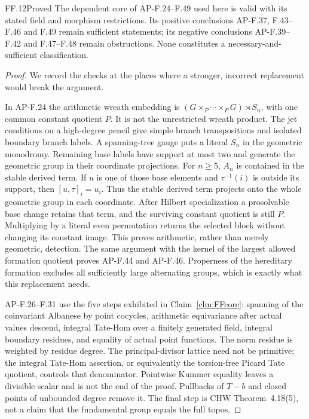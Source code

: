\begin{claim}{FF.12}{Proved}\label{clm:FFaudit}
The dependent core of AP-F.24--F.49 used here is valid with its
stated field and morphism restrictions. Its positive conclusions
AP-F.37, F.43--F.46 and F.49 remain sufficient statements; its
negative conclusions AP-F.39--F.42 and F.47--F.48 remain obstructions.
None constitutes a necessary-and-sufficient classification.
\end{claim}
\begin{proof}
We record the checks at the places where a stronger, incorrect
replacement would break the argument.

In AP-F.24 the arithmetic wreath embedding is
\((G\times_P\cdots\times_PG)\rtimes S_n\), with one common
constant quotient \(P\). It is not the unrestricted wreath
product. The jet conditions on a high-degree pencil give simple
branch transpositions and isolated boundary branch labels.
A spanning-tree gauge puts a literal \(S_n\) in the geometric
monodromy. Remaining base labels have support at most two and
generate the geometric group in their coordinate projections.
For \(n\ge5\), \(A_n\) is contained in the stable derived
term. If \(u\) is one of those base elements and
\(\tau^{-1}(i)\) is outside its support, then
\([u,\tau]_i=u_i\). Thus the stable derived term projects onto
the whole geometric group in each coordinate. After Hilbert
specialization a prosolvable base change retains that term, and
the surviving constant quotient is still \(P\). Multiplying
by a literal even permutation returns the selected block without
changing its constant image. This proves arithmetic, rather than
merely geometric, detection. The same argument with the kernel
of the largest allowed formation quotient proves AP-F.44 and
AP-F.46. Properness of the hereditary formation excludes all
sufficiently large alternating groups, which is exactly what
this replacement needs.

AP-F.26--F.31 use the five steps exhibited in
Claim~\ref{clm:FFcore}: spanning of the coinvariant Albanese by
point cocycles, arithmetic equivariance after actual values descend,
integral Tate-Hom over a finitely generated field, integral boundary
residues, and equality of actual point functions. The norm residue
is weighted by residue degree. The principal-divisor lattice need
not be primitive; the integral Tate-Hom assertion, or equivalently
the torsion-free Picard Tate quotient, controls that denominator.
Pointwise Kummer equality leaves a divisible scalar and is not the
end of the proof. Pullbacks of \(T-b\) and closed points of
unbounded degree remove it. The final step is CHW Theorem~4.18(5),
not a claim that the fundamental group equals the full topos.


\end{proof}
